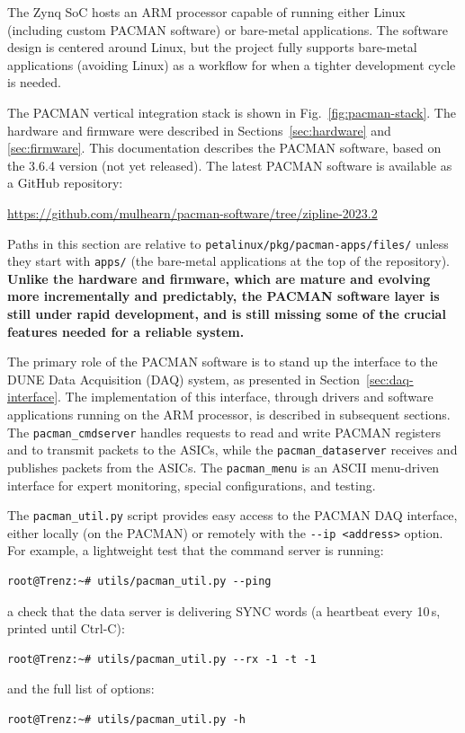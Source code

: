 \documentclass[12pt]{article}
\begin{document}
\noindent
The Zynq SoC hosts an ARM processor capable of running either Linux (including custom PACMAN
software) or bare-metal applications.  The software design is centered around Linux, but the project
fully supports bare-metal applications (avoiding Linux) as a workflow for when a tighter development
cycle is needed.

The PACMAN vertical integration stack is shown in Fig.~\ref{fig:pacman-stack}.  The hardware and
firmware were described in Sections~\ref{sec:hardware} and \ref{sec:firmware}.  This documentation
describes the PACMAN software, based on the 3.6.4 version (not yet released).  The latest PACMAN
software is available as a GitHub repository:
\begin{center} \url{https://github.com/mulhearn/pacman-software/tree/zipline-2023.2} \end{center}
Paths in this section are relative to \texttt{petalinux/pkg/pacman-apps/files/} unless they start
with \texttt{apps/} (the bare-metal applications at the top of the repository).  {\bf Unlike the
  hardware and firmware, which are mature and evolving more incrementally and predictably, the
  PACMAN software layer is still under rapid development, and is still missing some of the crucial
  features needed for a reliable system.}

The primary role of the PACMAN software is to stand up the interface to the DUNE Data Acquisition
(DAQ) system, as presented in Section~\ref{sec:daq-interface}.  The implementation of this
interface, through drivers and software applications running on the ARM processor, is described in
subsequent sections.  The {\tt pacman\_cmdserver} handles requests to read and write PACMAN
registers and to transmit packets to the ASICs, while the {\tt pacman\_dataserver} receives and
publishes packets from the ASICs.  The {\tt pacman\_menu} is an ASCII menu-driven interface for
expert monitoring, special configurations, and testing.

The {\tt pacman\_util.py} script provides easy access to the PACMAN DAQ interface, either locally (on the
PACMAN) or remotely with the \texttt{-{}-ip <address>} option.  For example, a lightweight test that the
command server is running:
\begin{lstlisting}[frame=leftline]
root@Trenz:~# utils/pacman_util.py --ping
\end{lstlisting}
a check that the data server is delivering SYNC words (a heartbeat every 10\,s, printed until
Ctrl-C):
\begin{lstlisting}[frame=leftline]
root@Trenz:~# utils/pacman_util.py --rx -1 -t -1
\end{lstlisting}
and the full list of options:
\begin{lstlisting}[frame=leftline]
root@Trenz:~# utils/pacman_util.py -h
\end{lstlisting}
\end{document}
